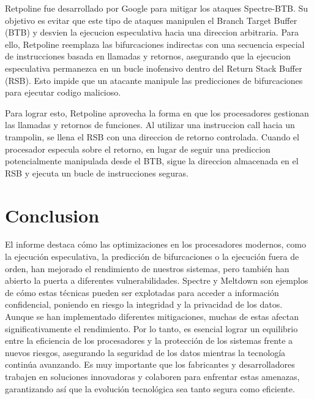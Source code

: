 \documentclass[lettersize,compsoc]{IEEEtran}
\begin{document}
Retpoline fue desarrollado por Google para mitigar los ataques Spectre-BTB. Su objetivo es evitar que este tipo de ataques manipulen el Branch Target Buffer (BTB) y desvien la ejecucion especulativa hacia una direccion arbitraria. Para ello, Retpoline reemplaza las bifurcaciones indirectas con una secuencia especial de instrucciones basada en llamadas y retornos, asegurando que la ejecucion especulativa permanezca en un bucle inofensivo dentro del Return Stack Buffer (RSB). Esto impide que un atacante manipule las predicciones de bifurcaciones para ejecutar codigo malicioso.

Para lograr esto, Retpoline aprovecha la forma en que los procesadores gestionan las llamadas y retornos de funciones. Al utilizar una instruccion call hacia un trampolin, se llena el RSB con una direccion de retorno controlada. Cuando el procesador especula sobre el retorno, en lugar de seguir una prediccion potencialmente manipulada desde el BTB, sigue la direccion almacenada en el RSB y ejecuta un bucle de instrucciones seguras.


\section{Conclusion}
El informe destaca cómo las optimizaciones en los procesadores modernos, como la ejecución especulativa, la predicción de bifurcaciones o la ejecución fuera de orden, han mejorado el rendimiento de nuestros sistemas, pero también han abierto la puerta a diferentes vulnerabilidades. Spectre y Meltdown son ejemplos de cómo estas técnicas pueden ser explotadas para acceder a información confidencial, poniendo en riesgo la integridad y la privacidad de los datos. Aunque se han implementado diferentes mitigaciones, muchas de estas afectan significativamente el rendimiento. Por lo tanto, es esencial lograr un equilibrio entre la eficiencia de los procesadores y la protección de los sistemas frente a nuevos riesgos, asegurando la seguridad de los datos mientras la tecnología continúa avanzando. Es muy importante que los fabricantes y desarrolladores trabajen en soluciones innovadoras y colaboren para enfrentar estas amenazas, garantizando así que la evolución tecnológica sea tanto segura como eficiente.
\end{document}
